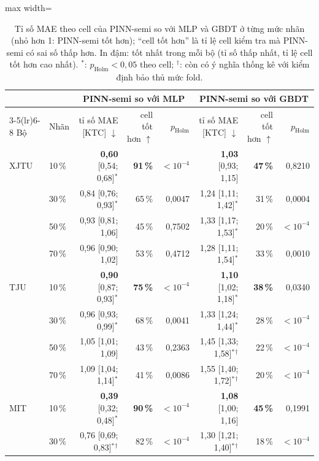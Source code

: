 \begin{table}[!htbp]\centering\scriptsize
\caption[Tỉ số MAE của PINN-semi so với MLP và GBDT]{Tỉ số MAE theo cell của PINN-semi so với MLP và GBDT ở từng mức nhãn (nhỏ hơn 1: PINN-semi tốt hơn); “cell tốt hơn” là tỉ lệ cell kiểm tra mà PINN-semi có sai số thấp hơn. In đậm: tốt nhất trong mỗi bộ (tỉ số thấp nhất, tỉ lệ cell tốt hơn cao nhất). $^{*}$: $p_\text{Holm} < 0{,}05$ theo cell; $^{\dagger}$: còn có ý nghĩa thống kê với kiểm định bảo thủ mức fold.}\label{tab:cmp}
\begin{adjustbox}{max width=\textwidth}\begin{tabular}{llrrrrrr}\toprule
 & & \multicolumn{3}{c}{PINN-semi so với MLP} & \multicolumn{3}{c}{PINN-semi so với GBDT} \\\cmidrule(lr){3-5}\cmidrule(lr){6-8}
Bộ & Nhãn & tỉ số MAE [KTC] $\downarrow$ & cell tốt hơn $\uparrow$ & $p_\text{Holm}$ & tỉ số MAE [KTC] $\downarrow$ & cell tốt hơn $\uparrow$ & $p_\text{Holm}$ \\\midrule
XJTU & 10\,\% & \textbf{0{,}60} [0{,}54; 0{,}68]$^{*}$ & \textbf{91\,\%} & $<10^{-4}$ & \textbf{1{,}03} [0{,}93; 1{,}15] & \textbf{47\,\%} & 0{,}8210 \\
 & 30\,\% & 0{,}84 [0{,}76; 0{,}93]$^{*}$ & 65\,\% & 0{,}0047 & 1{,}24 [1{,}11; 1{,}42]$^{*}$ & 31\,\% & 0{,}0004 \\
 & 50\,\% & 0{,}93 [0{,}81; 1{,}06] & 45\,\% & 0{,}7502 & 1{,}33 [1{,}17; 1{,}53]$^{*}$ & 20\,\% & $<10^{-4}$ \\
 & 70\,\% & 0{,}96 [0{,}90; 1{,}02] & 53\,\% & 0{,}4712 & 1{,}28 [1{,}11; 1{,}54]$^{*}$ & 33\,\% & 0{,}0010 \\
TJU & 10\,\% & \textbf{0{,}90} [0{,}87; 0{,}93]$^{*}$ & \textbf{75\,\%} & $<10^{-4}$ & \textbf{1{,}10} [1{,}02; 1{,}18]$^{*}$ & \textbf{38\,\%} & 0{,}0340 \\
 & 30\,\% & 0{,}96 [0{,}93; 0{,}99]$^{*}$ & 68\,\% & 0{,}0041 & 1{,}33 [1{,}24; 1{,}44]$^{*}$ & 28\,\% & $<10^{-4}$ \\
 & 50\,\% & 1{,}05 [1{,}01; 1{,}09] & 43\,\% & 0{,}2363 & 1{,}45 [1{,}33; 1{,}58]$^{*}$$^{\dagger}$ & 22\,\% & $<10^{-4}$ \\
 & 70\,\% & 1{,}09 [1{,}04; 1{,}14]$^{*}$ & 41\,\% & 0{,}0086 & 1{,}55 [1{,}40; 1{,}72]$^{*}$$^{\dagger}$ & 20\,\% & $<10^{-4}$ \\
MIT & 10\,\% & \textbf{0{,}39} [0{,}32; 0{,}48]$^{*}$ & \textbf{90\,\%} & $<10^{-4}$ & \textbf{1{,}08} [1{,}00; 1{,}16] & \textbf{45\,\%} & 0{,}1991 \\
 & 30\,\% & 0{,}76 [0{,}69; 0{,}83]$^{*}$$^{\dagger}$ & 82\,\% & $<10^{-4}$ & 1{,}30 [1{,}21; 1{,}40]$^{*}$$^{\dagger}$ & 18\,\% & $<10^{-4}$ \\

\end{tabular}
\end{adjustbox}
\end{table}
